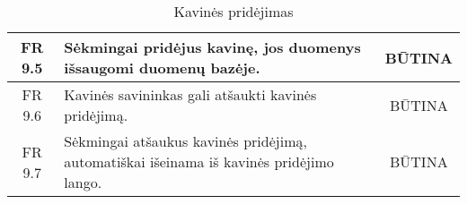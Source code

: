\documentclass{VUMIFPSkursinis}
\begin{document}
\begin{center}
\begin{table}[H]
\begin{tabular}{|p{2cm}|p{}|p{}|}
	\hline
		\multicolumn{1}{|c|}{FR 9.5}&
		{Sėkmingai pridėjus kavinę, jos duomenys išsaugomi duomenų bazėje.}&
		\multicolumn{1}{|c|}{BŪTINA}\\	

	\hline
		\multicolumn{1}{|c|}{FR 9.6}&
		{Kavinės savininkas gali atšaukti kavinės pridėjimą.}&
		\multicolumn{1}{|c|}{BŪTINA}\\	

	\hline
		\multicolumn{1}{|c|}{FR 9.7}&
		{Sėkmingai atšaukus kavinės pridėjimą, automatiškai išeinama iš kavinės pridėjimo lango.}&
		\multicolumn{1}{|c|}{BŪTINA}\\	

	\hline
	
	
	
	\end{tabular}
	\caption{Kavinės pridėjimas}
	\label{table:KavinėsPridėjimas}		
	\end{table}

\end{center}
\end{document}
